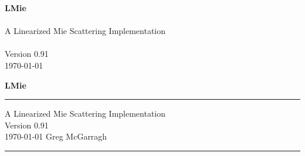 %



\titleformat{\chapter}{\bf\LARGE}{\thechapter}{1em}{}


%
\newcommand\version{0.91}

\newcommand{\compresslist}{%
\vspace{-10.0pt}%
\setlength{\topsep}{0.0pt}%
\setlength{\partopsep}{0.0pt}%
\setlength{\itemsep}{1.25pt}%
}%


%


%





\frontmatter


\iftth
\begin{center}
{\huge \bfseries LMie} \\ \\
A Linearized Mie Scattering Implementation\\ \\
Version \version \\
\today
\end{center}
\else
\begin{titlepage}
\vspace*{1.25in}
{\noindent \huge \bfseries LMie} \\
\rule{\linewidth}{3.0pt}
\flushright
A Linearized Mie Scattering Implementation \\
Version \version \\
\usdate\today
\vfill
\flushleft
\Large Greg McGarragh
\rule{\linewidth}{1.5pt}
\end{titlepage}
\fi


